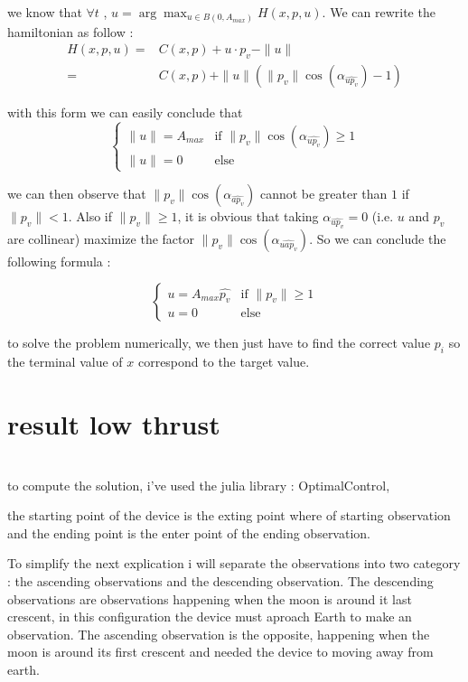 \documentclass{article} %
\begin{document}
			we know that $\forall t$ , $u=\arg\max_{u\in B(0,A_{max})}H(x,p,u)$. We can rewrite the hamiltonian as follow : 
			$$
			\begin{align}
				H(x,p,u)=&C(x,p)+u\cdot p_v-\|u\| \\
				=&C(x,p)+\|u\|(\|p_v\|\cos(\alpha_{\widehat{up_v}})-1)
			\end{align}
			$$ 
			
			with this form we can easily conclude that 
			$$
			\begin{cases}
				\| u\| =A_{max} & \text{if } \|p_v\|\cos(\alpha_{\widehat{up_v}})\ge1\\
				\| u\| =0 & \text{else}
			\end{cases}
			$$
			
			we can then observe that $\|p_v\|\cos(\alpha_{\widehat{ap_v}})$ cannot be greater than $1$ if $\|p_v\| < 1$. Also if $\|p_v\| \ge 1$, it is obvious that taking $\alpha_{\widehat{up_v}}=0$ (i.e. $u$ and $p_v$ are collinear) maximize the factor $\|p_v\|\cos(\alpha_{\widehat{uap_v}})$. So we can conclude the following formula :
			
			$$
			\begin{cases}
				 u =A_{max}\widehat{p_v} & \text{if }\|p_v\| \ge 1\\
				 u =0 & \text{else}
			\end{cases}
			$$
			
			to solve the problem numerically, we then just have to find the correct value $p_i$ so the terminal value of $x$ correspond to the target value.
			
			\section{result low thrust}
				\\
			to compute the solution, i've used the julia library : OptimalControl,
			
			the starting point of the device is the exting point where of starting observation and the ending point is the enter point of the ending observation.
			
			To simplify the next explication i will separate the observations into two category : the ascending observations and the descending observation. The descending observations are observations happening when the moon is around it last crescent, in this configuration the device must aproach Earth to make an observation. The ascending observation is the opposite, happening when the moon is around its first crescent and needed the device to moving away from earth.
			
\end{document}
